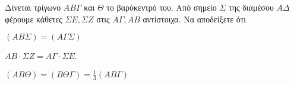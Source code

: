 \documentclass[ektypwsh]{diag-xelatex}
\begin{document}
\begin{thema}
Δίνεται τρίγωνο $ AB\varGamma $ και $ \varTheta $ το βαρύκεντρό του. Από σημείο $ \varSigma $ της διαμέσου $ A\varDelta $ φέρουμε κάθετες $ \varSigma E,\varSigma Z $ στις $ A\Gamma,AB $ αντίστοιχα. Να αποδείξετε ότι
\begin{multicols}{2}
\begin{rlist}
\item $ (AB\varSigma)=(A\varGamma\varSigma) $
\item $ AB\cdot \varSigma Z=A\varGamma\cdot\varSigma E $.
\item $ (AB\varTheta)=(B\varTheta\varGamma)=\frac{1}{3}(AB\varGamma) $
\end{rlist}
\end{multicols}
\end{thema}
\end{document}
